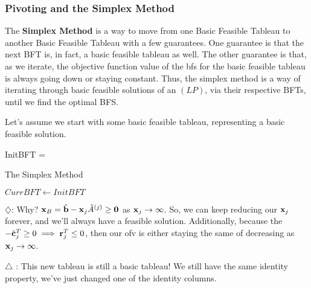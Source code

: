 \subsubsection{Pivoting and the Simplex Method}

The \textbf{Simplex Method} is a way to move from one Basic Feasible Tableau
to another Basic Feasible Tableau with a few guarantees. 
One guarantee is that the next BFT is, in fact, a basic feasible
tableau as well. The other guarantee is that,
as we iterate, the objective function value of the bfs for the basic feasible
tableau is always going down or staying constant. 
Thus, the simplex method is a way of iterating through
basic feasible solutions of an $(LP)$, via their respective BFTs, until we find
the optimal BFS.

Let's assume we start with some basic feasible tableau, representing a basic feasible 
solution.

\begin{frml}
	InitBFT = 
\end{frml}

\begin{algorithm}\label{alg:simplex-method}
\caption{The Simplex Method}
	$CurrBFT \leftarrow InitBFT$\;
\end{algorithm}

$\diamondsuit$:
		Why? $\mathbf{x}_B = \hat{\mathbf{b}} - \mathbf{x}_j\hat{A}^{(j)} \geq \mathbf{0}$ as
		$\mathbf{x}_j \rightarrow \infty$. So, we can keep reducing our $\mathbf{x}_j$ forever,
		and we'll always have a feasible solution. Additionally, because the
		$-\hat{\mathbf{c}}^T_j \geq 0 \implies \mathbf{r}^T_j \leq 0$, then our ofv is either
		staying the same of decreasing as $\mathbf{x}_j \rightarrow \infty$.

$\triangle$ : This new tableau is still a basic tableau! We still have the same
identity property, we've just changed one of the identity columns.


